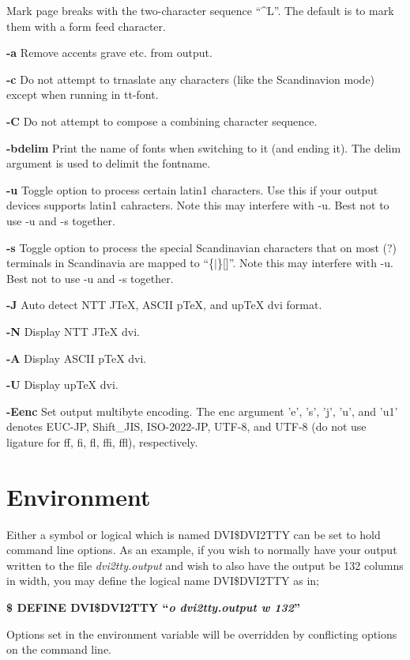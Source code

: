 \begin{list}{}{\setlength{\leftmargin}{0.6in}}
Mark page breaks with the two-character sequence ``\^{}L''. The default is
to mark them with a form feed character.
\item[{{\bf -a}}]
Remove accents grave etc. from output.
\item[{{\bf -c}}]
Do not attempt to trnaslate any characters (like the Scandinavion mode)
except when running in tt-font.
\item[{{\bf -C}}]
Do not attempt to compose a combining character sequence.
\item[{{\bf -bdelim}}]
Print the name of fonts when switching to it (and ending it). The delim
argument is used to delimit the fontname.
\item[{{\bf -u}}]
Toggle option to process certain latin1 characters. Use this if your output
devices supports latin1 cahracters.
Note this may interfere with -u. Best not to use -u and -s together.
\item[{{\bf -s}}]
Toggle option to process the special Scandinavian characters that on most (?)
terminals in Scandinavia are mapped to ``\{$|$\}[\bs ]''.
Note this may interfere with -u. Best not to use -u and -s together.
\item[{{\bf -J}}]
Auto detect NTT JTeX, ASCII pTeX, and upTeX dvi format.
\item[{{\bf -N}}]
Display NTT JTeX dvi.
\item[{{\bf -A}}]
Display ASCII pTeX dvi.
\item[{{\bf -U}}]
Display upTeX dvi.
\item[{{\bf -Eenc}}]
Set output multibyte encoding. The enc argument 'e', 's', 'j', 'u', and 'u1'
denotes EUC-JP, Shift\_JIS, ISO-2022-JP, UTF-8,
and UTF-8 (do not use ligature for ff, fi, fl, ffi, ffl), respectively.
\end{list}
%
%
\section*{Environment}
%
%
%
%
Either a symbol or logical which is named DVI\$DVI2TTY can be set to hold
command line options.  As an example,  if you wish to normally have your
output written to the file {\it dvi2tty.output}\/ and wish to also have
the output be 132 columns in width,  you may define the logical name
DVI\$DVI2TTY as in;
\par\vspace{1.0\baselineskip}
\begin{center}
{\bf \$ DEFINE DVI\$DVI2TTY ``{\it o dvi2tty.output w 132}''}
\end{center}
\par\vspace{1.0\baselineskip}
Options set in the environment variable will be overridden by conflicting
options on the command line.

